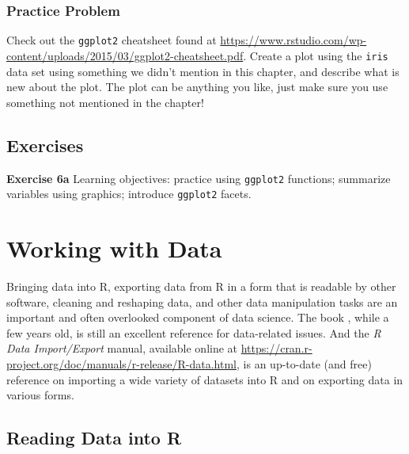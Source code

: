 \documentclass[]{krantz}
\begin{document}
\subsection{Practice Problem}\label{practice-problem-5}

Check out the \texttt{ggplot2} cheatsheet found at
\url{https://www.rstudio.com/wp-content/uploads/2015/03/ggplot2-cheatsheet.pdf}.
Create a plot using the \texttt{iris} data set using something we didn't
mention in this chapter, and describe what is new about the plot. The
plot can be anything you like, just make sure you use something not
mentioned in the chapter!

\section{Exercises}\label{exercises-2}

\textbf{Exercise 6a} Learning objectives: practice using
\texttt{ggplot2} functions; summarize variables using graphics;
introduce \texttt{ggplot2} facets.

\chapter{Working with Data}\label{data2}

Bringing data into R, exporting data from R in a form that is readable
by other software, cleaning and reshaping data, and other data
manipulation tasks are an important and often overlooked component of
data science. The book \citet{SpectorDataManipulation}, while a few
years old, is still an excellent reference for data-related issues. And
the \emph{R Data Import/Export} manual, available online at
\url{https://cran.r-project.org/doc/manuals/r-release/R-data.html}, is
an up-to-date (and free) reference on importing a wide variety of
datasets into R and on exporting data in various forms.

\section{Reading Data into R}\label{reading-data-into-r}
\end{document}
